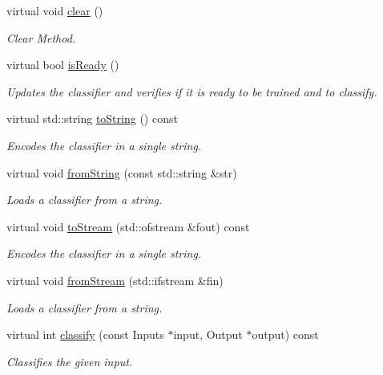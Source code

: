 \begin{DoxyCompactItemize}
\item 
virtual void \hyperlink{classiCub_1_1boostMIL_1_1MILClassifier_a39e02e74a674db1377a0a443700d0931}{clear} ()
\begin{DoxyCompactList}\small\item\em Clear Method. \end{DoxyCompactList}\item 
virtual bool \hyperlink{classiCub_1_1boostMIL_1_1MILClassifier_abba1ac0b9c33c01e843ca6f4cc7e0729}{is\+Ready} ()
\begin{DoxyCompactList}\small\item\em Updates the classifier and verifies if it is ready to be trained and to classify. \end{DoxyCompactList}\item 
virtual std\+::string \hyperlink{classiCub_1_1boostMIL_1_1MILClassifier_a9d32fbaf8d24e488e944f3382ff45937}{to\+String} () const 
\begin{DoxyCompactList}\small\item\em Encodes the classifier in a single string. \end{DoxyCompactList}\item 
virtual void \hyperlink{classiCub_1_1boostMIL_1_1MILClassifier_a96d16be5ffa0f61d038cb3270133fbd7}{from\+String} (const std\+::string \&str)
\begin{DoxyCompactList}\small\item\em Loads a classifier from a string. \end{DoxyCompactList}\item 
virtual void \hyperlink{classiCub_1_1boostMIL_1_1MILClassifier_a9c9067f6678dfb2ec83bd2945e403edf}{to\+Stream} (std\+::ofstream \&fout) const 
\begin{DoxyCompactList}\small\item\em Encodes the classifier in a single string. \end{DoxyCompactList}\item 
virtual void \hyperlink{classiCub_1_1boostMIL_1_1MILClassifier_a140a4086c3032e55a6efd6ebf2f486aa}{from\+Stream} (std\+::ifstream \&fin)
\begin{DoxyCompactList}\small\item\em Loads a classifier from a string. \end{DoxyCompactList}\item 
virtual int \hyperlink{classiCub_1_1boostMIL_1_1MILClassifier_a06504e464b445939f28d82a36faaf3c1}{classify} (const Inputs $\ast$input, Output $\ast$output) const 
\begin{DoxyCompactList}\small\item\em Classifies the given input. \end{DoxyCompactList}\item 

\end{DoxyCompactItemize}
